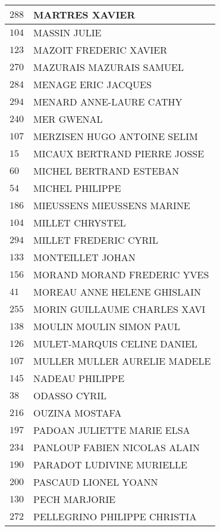 \begin{xltabular}{\linewidth}{|l|X|}
    \hline
    $288$ & MARTRES XAVIER \\
    \hline
    $104$ & MASSIN JULIE \\
    \hline
    $123$ & MAZOIT FREDERIC XAVIER \\
    \hline
    $270$ & MAZURAIS MAZURAIS SAMUEL \\
    \hline
    $284$ & MENAGE ERIC JACQUES \\
    \hline
    $294$ & MENARD ANNE-LAURE CATHY \\
    \hline
    $240$ & MER GWENAL \\
    \hline
    $107$ & MERZISEN HUGO ANTOINE SELIM \\
    \hline
    $15$ & MICAUX BERTRAND PIERRE JOSSE \\
    \hline
    $60$ & MICHEL BERTRAND ESTEBAN \\
    \hline
    $54$ & MICHEL PHILIPPE \\
    \hline
    $186$ & MIEUSSENS MIEUSSENS MARINE \\
    \hline
    $104$ & MILLET CHRYSTEL \\
    \hline
    $294$ & MILLET FREDERIC CYRIL \\
    \hline
    $133$ & MONTEILLET JOHAN \\
    \hline
    $156$ & MORAND MORAND FREDERIC YVES \\
    \hline
    $41$ & MOREAU ANNE HELENE GHISLAIN \\
    \hline
    $255$ & MORIN GUILLAUME CHARLES XAVI \\
    \hline
    $138$ & MOULIN MOULIN SIMON PAUL \\
    \hline
    $126$ & MULET-MARQUIS CELINE DANIEL \\
    \hline
    $107$ & MULLER MULLER AURELIE MADELE \\
    \hline
    $145$ & NADEAU PHILIPPE \\
    \hline
    $38$ & ODASSO CYRIL \\
    \hline
    $216$ & OUZINA MOSTAFA \\
    \hline
    $197$ & PADOAN JULIETTE MARIE ELSA \\
    \hline
    $234$ & PANLOUP FABIEN NICOLAS ALAIN \\
    \hline
    $190$ & PARADOT LUDIVINE MURIELLE \\
    \hline
    $200$ & PASCAUD LIONEL YOANN \\
    \hline
    $130$ & PECH MARJORIE \\
    \hline
    $272$ & PELLEGRINO PHILIPPE CHRISTIA \\

\end{xltabular}
